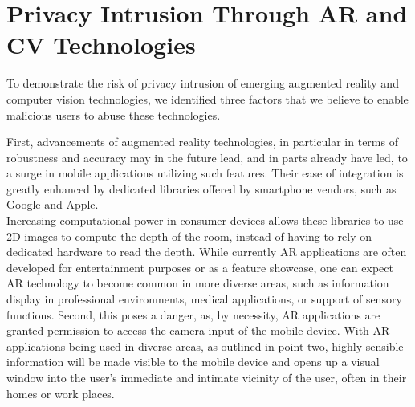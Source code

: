 
\section{Privacy Intrusion Through AR and CV Technologies}

To demonstrate the risk of privacy intrusion of emerging augmented reality and computer vision technologies, we identified three factors that we believe to enable malicious users to abuse these technologies.

First, advancements of augmented reality technologies, in particular in terms of robustness and accuracy may in the future lead, and in parts already have led, to a surge in mobile applications utilizing such features.
Their ease of integration is greatly enhanced by dedicated libraries offered by smartphone vendors, such as Google and Apple.\\
Increasing computational power in consumer devices allows these libraries to use 2D images to compute the depth of the room, instead of having to rely on dedicated hardware to read the depth.
While currently AR applications are often developed for entertainment purposes or as a feature showcase, one can expect AR technology to become common in more diverse areas, such as information display in professional environments, medical applications, or support of sensory functions.
Second, this poses a danger, as, by necessity, AR applications are granted permission to access the camera input of the mobile device.
With AR applications being used in diverse areas, as outlined in point two, highly sensible information will be made visible to the mobile device and opens up a visual window into the user's immediate and intimate vicinity of the user, often in their homes or work places.\\
